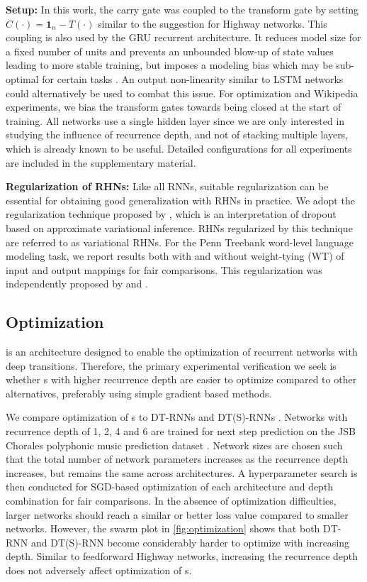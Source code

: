 \documentclass[letterpaper]{article}
\begin{document}
\textbf{Setup:}
In this work, the carry gate was coupled to the transform gate by setting $C(\cdot) = \mathbf{1}_n-T(\cdot)$ similar to the suggestion for Highway networks.
This coupling is also used by the GRU recurrent architecture.
It reduces model size for a fixed number of units and prevents an unbounded blow-up of state values leading to more stable training, but imposes a modeling bias which may be sub-optimal for certain tasks \citep{greff2015lstm,jozefowicz2015}. 
An output non-linearity similar to LSTM networks could alternatively be used to combat this issue.
For optimization and Wikipedia experiments, we bias the transform gates towards being closed at the start of training.
All networks use a single hidden \arch{} layer since we are only interested in studying the influence of recurrence depth, and not of stacking multiple layers, which is already known to be useful.
Detailed configurations for all experiments are included in the supplementary material.


\textbf{Regularization of RHNs:}
Like all RNNs, suitable regularization can be essential for obtaining good generalization with RHNs in practice.
We adopt the regularization technique proposed by \citet{gal2015}, which is an interpretation of dropout based on approximate variational inference.
RHNs regularized by this technique are referred to as variational RHNs.
For the Penn Treebank word-level language modeling task, we report results both with and without weight-tying (WT) of input and output mappings for fair comparisons. This regularization was independently proposed by \citet{shared_embedding} and \citet{weight_tying}.



\subsection{Optimization}\label{sec:optimization}
\arch{} is an architecture designed to enable the optimization of recurrent networks with deep transitions.
Therefore, the primary experimental verification we seek is whether \arch{}s with higher recurrence depth are easier to optimize compared to other alternatives, preferably using simple gradient based methods.

We compare optimization of \arch{}s to DT-RNNs and DT(S)-RNNs \citep{pascanu}. 
Networks with recurrence depth of 1, 2, 4 and 6 are trained for next step prediction on the JSB Chorales polyphonic music prediction dataset \citep{polyphonic_music}.
Network sizes are chosen such that the total number of network parameters increases as the recurrence depth increases, but remains the same across architectures.
A hyperparameter search is then conducted for SGD-based optimization of each architecture and depth combination for fair comparisons.
In the absence of optimization difficulties, larger networks should  reach a similar or better loss value compared to smaller networks.
However, the swarm plot in \autoref{fig:optimization} shows that both DT-RNN and DT(S)-RNN become considerably harder to optimize with increasing depth.
Similar to feedforward Highway networks, increasing the recurrence depth does not adversely affect optimization of \arch{}s.
\end{document}
